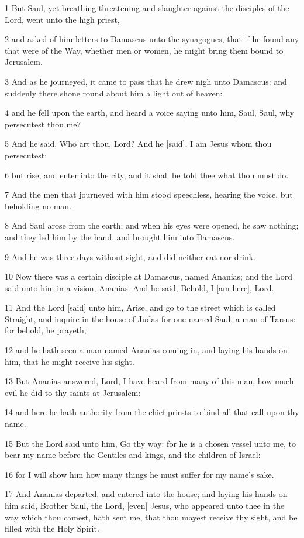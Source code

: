 \par 1 But Saul, yet breathing threatening and slaughter against the disciples of the Lord, went unto the high priest,
\par 2 and asked of him letters to Damascus unto the synagogues, that if he found any that were of the Way, whether men or women, he might bring them bound to Jerusalem.
\par 3 And as he journeyed, it came to pass that he drew nigh unto Damascus: and suddenly there shone round about him a light out of heaven:
\par 4 and he fell upon the earth, and heard a voice saying unto him, Saul, Saul, why persecutest thou me?
\par 5 And he said, Who art thou, Lord? And he [said], I am Jesus whom thou persecutest:
\par 6 but rise, and enter into the city, and it shall be told thee what thou must do.
\par 7 And the men that journeyed with him stood speechless, hearing the voice, but beholding no man.
\par 8 And Saul arose from the earth; and when his eyes were opened, he saw nothing; and they led him by the hand, and brought him into Damascus.
\par 9 And he was three days without sight, and did neither eat nor drink.
\par 10 Now there was a certain disciple at Damascus, named Ananias; and the Lord said unto him in a vision, Ananias. And he said, Behold, I [am here], Lord.
\par 11 And the Lord [said] unto him, Arise, and go to the street which is called Straight, and inquire in the house of Judas for one named Saul, a man of Tarsus: for behold, he prayeth;
\par 12 and he hath seen a man named Ananias coming in, and laying his hands on him, that he might receive his sight.
\par 13 But Ananias answered, Lord, I have heard from many of this man, how much evil he did to thy saints at Jerusalem:
\par 14 and here he hath authority from the chief priests to bind all that call upon thy name.
\par 15 But the Lord said unto him, Go thy way: for he is a chosen vessel unto me, to bear my name before the Gentiles and kings, and the children of Israel:
\par 16 for I will show him how many things he must suffer for my name's sake.
\par 17 And Ananias departed, and entered into the house; and laying his hands on him said, Brother Saul, the Lord, [even] Jesus, who appeared unto thee in the way which thou camest, hath sent me, that thou mayest receive thy sight, and be filled with the Holy Spirit.
